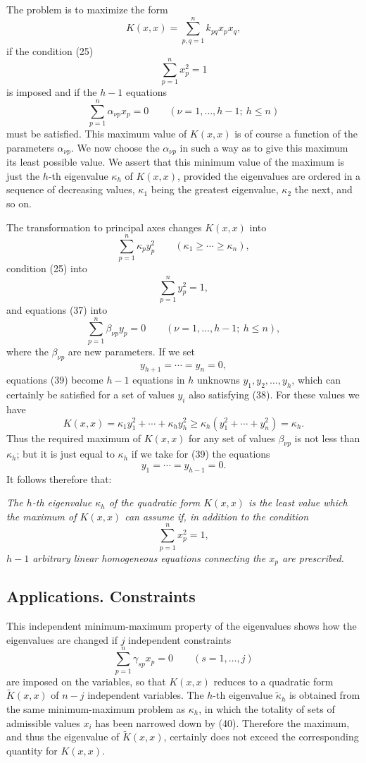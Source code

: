 The problem is to maximize the form
\[
K(x,x)=\sum_{p,q=1}^{n}k_{pq}x_px_q,
\]
if the condition (25)
\[
\sum_{p=1}^{n}x_p^2=1
\]
is imposed and if the $h-1$ equations
\begin{equation*}
\sum_{p=1}^{n}\alpha_{\nu p}x_p=0\qquad(\nu=1,\ldots,h-1;\ h\le n)
\tag{37}
\end{equation*}
must be satisfied. This maximum value of $K(x,x)$ is of course a function of the parameters $\alpha_{\nu p}$. We now choose the $\alpha_{\nu p}$ in such a way as to give this maximum its least possible value. We assert that this minimum value of the maximum is just the $h$-th eigenvalue $\kappa_h$ of $K(x,x)$, provided the eigenvalues are ordered in a sequence of decreasing values, $\kappa_1$ being the greatest eigenvalue, $\kappa_2$ the next, and so on.

The transformation to principal axes changes $K(x,x)$ into
\[
\sum_{p=1}^{n}\kappa_p y_p^2\qquad(\kappa_1\ge\cdots\ge\kappa_n),
\]
condition (25) into
\begin{equation*}
\sum_{p=1}^{n}y_p^2=1,
\tag{38}
\end{equation*}
and equations (37) into
\begin{equation*}
\sum_{p=1}^{n}\beta_{\nu p}y_p=0\qquad(\nu=1,\ldots,h-1;\ h\le n),
\tag{39}
\end{equation*}
where the $\beta_{\nu p}$ are new parameters. If we set
\[
y_{h+1}=\cdots=y_n=0,
\]
equations (39) become $h-1$ equations in $h$ unknowns $y_1,y_2,\ldots,y_h$, which can certainly be satisfied for a set of values $y_i$ also satisfying (38). For these values we have
\[
K(x,x)=\kappa_1y_1^2+\cdots+\kappa_hy_h^2\ge \kappa_h(y_1^2+\cdots+y_n^2)=\kappa_h.
\]
Thus the required maximum of $K(x,x)$ for any set of values $\beta_{\nu p}$ is not less than $\kappa_h$; but it is just equal to $\kappa_h$ if we take for (39) the equations
\[
y_1=\cdots=y_{h-1}=0.
\]
It follows therefore that:

\emph{The $h$-th eigenvalue $\kappa_h$ of the quadratic form $K(x,x)$ is the least value which the maximum of $K(x,x)$ can assume if, in addition to the condition
\[
\sum_{p=1}^{n}x_p^2=1,
\]
$h-1$ arbitrary linear homogeneous equations connecting the $x_p$ are prescribed.}

\subsection{Applications. Constraints}
This independent minimum-maximum property of the eigenvalues shows how the eigenvalues are changed if $j$ independent constraints
\begin{equation*}
\sum_{p=1}^{n}\gamma_{sp}x_p=0\qquad(s=1,\ldots,j)
\tag{40}
\end{equation*}
are imposed on the variables, so that $K(x,x)$ reduces to a quadratic form $\widetilde K(x,x)$ of $n-j$ independent variables. The $h$-th eigenvalue $\widetilde\kappa_h$ is obtained from the same minimum-maximum problem as $\kappa_h$, in which the totality of sets of admissible values $x_i$ has been narrowed down by (40). Therefore the maximum, and thus the eigenvalue of $\widetilde K(x,x)$, certainly does not exceed the corresponding quantity for $K(x,x)$.

